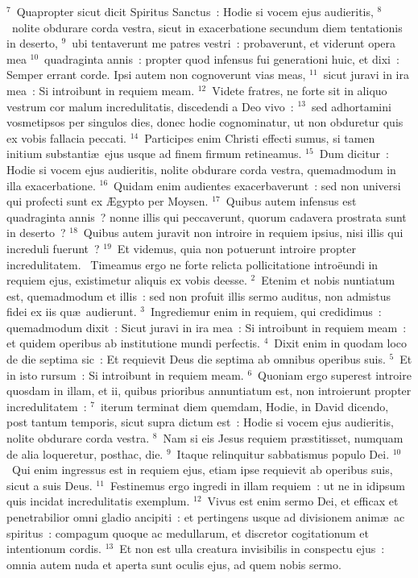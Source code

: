 ${}^{7}$~Quapropter sicut dicit Spiritus Sanctus~: Hodie si vocem ejus audieritis,
${}^{8}$~nolite obdurare corda vestra, sicut in exacerbatione secundum diem tentationis in deserto,
${}^{9}$~ubi tentaverunt me patres vestri~: probaverunt, et viderunt opera mea
${}^{10}$~quadraginta annis~: propter quod infensus fui generationi huic, et dixi~: Semper errant corde. Ipsi autem non cognoverunt vias meas,
${}^{11}$~sicut juravi in ira mea~: Si introibunt in requiem meam.
${}^{12}$~Videte fratres, ne forte sit in aliquo vestrum cor malum incredulitatis, discedendi a Deo vivo~:
${}^{13}$~sed adhortamini vosmetipsos per singulos dies, donec hodie cognominatur, ut non obduretur quis ex vobis fallacia peccati.
${}^{14}$~Participes enim Christi effecti sumus, si tamen initium substanti\ae\ ejus usque ad finem firmum retineamus.
${}^{15}$~Dum dicitur~: Hodie si vocem ejus audieritis, nolite obdurare corda vestra, quemadmodum in illa exacerbatione.
${}^{16}$~Quidam enim audientes exacerbaverunt~: sed non universi qui profecti sunt ex \AE gypto per Moysen.
${}^{17}$~Quibus autem infensus est quadraginta annis~? nonne illis qui peccaverunt, quorum cadavera prostrata sunt in deserto~?
${}^{18}$~Quibus autem juravit non introire in requiem ipsius, nisi illis qui increduli fuerunt~?
${}^{19}$~Et videmus, quia non potuerunt introire propter incredulitatem.
~Timeamus ergo ne forte relicta pollicitatione intro\"eundi in requiem ejus, existimetur aliquis ex vobis deesse.
${}^{2}$~Etenim et nobis nuntiatum est, quemadmodum et illis~: sed non profuit illis sermo auditus, non admistus fidei ex iis qu\ae\ audierunt.
${}^{3}$~Ingrediemur enim in requiem, qui credidimus~: quemadmodum dixit~: Sicut juravi in ira mea~: Si introibunt in requiem meam~: et quidem operibus ab institutione mundi perfectis.
${}^{4}$~Dixit enim in quodam loco de die septima sic~: Et requievit Deus die septima ab omnibus operibus suis.
${}^{5}$~Et in isto rursum~: Si introibunt in requiem meam.
${}^{6}$~Quoniam ergo superest introire quosdam in illam, et ii, quibus prioribus annuntiatum est, non introierunt propter incredulitatem~:
${}^{7}$~iterum terminat diem quemdam, Hodie, in David dicendo, post tantum temporis, sicut supra dictum est~: Hodie si vocem ejus audieritis, nolite obdurare corda vestra.
${}^{8}$~Nam si eis Jesus requiem pr\ae stitisset, numquam de alia loqueretur, posthac, die.
${}^{9}$~Itaque relinquitur sabbatismus populo Dei.
${}^{10}$~Qui enim ingressus est in requiem ejus, etiam ipse requievit ab operibus suis, sicut a suis Deus.
${}^{11}$~Festinemus ergo ingredi in illam requiem~: ut ne in idipsum quis incidat incredulitatis exemplum.
${}^{12}$~Vivus est enim sermo Dei, et efficax et penetrabilior omni gladio ancipiti~: et pertingens usque ad divisionem anim\ae\ ac spiritus~: compagum quoque ac medullarum, et discretor cogitationum et intentionum cordis.
${}^{13}$~Et non est ulla creatura invisibilis in conspectu ejus~: omnia autem nuda et aperta sunt oculis ejus, ad quem nobis sermo.


